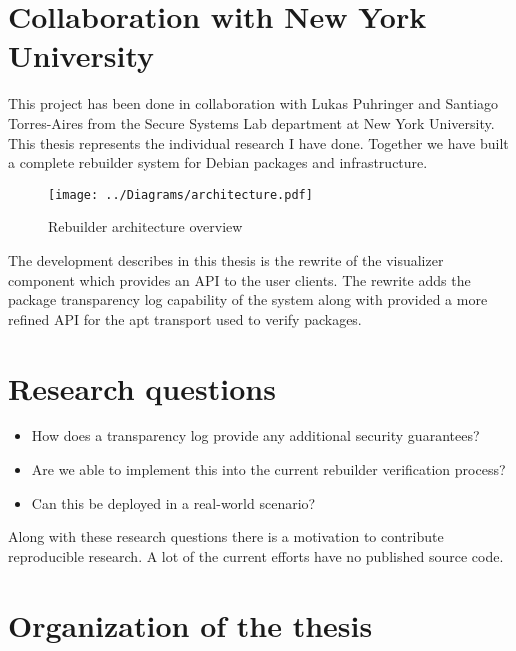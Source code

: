 \documentclass[../Main/thesis.tex]{subfiles}
\begin{document}
\section{Collaboration with New York University}\label{sec:collab}
This project has been done in collaboration with Lukas Puhringer and Santiago
Torres-Aires from the Secure Systems Lab department at New York University. This
thesis represents the individual research I have done. Together we have built a
complete rebuilder system for Debian packages and infrastructure. 

\begin{figure}[H]
\centering
\texttt{[image: ../Diagrams/architecture.pdf]}
\caption{Rebuilder architecture overview}
\label{fig:rebuilder_architecture}
\end{figure}

The development describes in this thesis is the rewrite of the visualizer
component which provides an API to the user clients. The rewrite adds the
package transparency log capability of the system along with provided a more
refined API for the apt transport used to verify packages.

\section{Research questions}\label{sec:rq}

\begin{itemize}
    \item How does a transparency log provide any additional security guarantees?
    \item Are we able to implement this into the current rebuilder verification
        process?
    \item Can this be deployed in a real-world scenario?
\end{itemize}


Along with these research questions there is a motivation to contribute
reproducible research. A lot of the current efforts have no published source
code.

\section{Organization of the thesis}\label{sec:organization}

\blankpage
\end{document}
